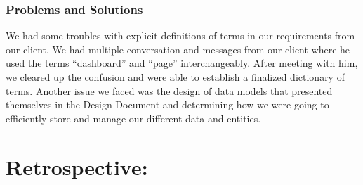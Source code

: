 \documentclass[journal,10pt,onecolumn,compsoc]{IEEEtran} \usepackage[margin=1.0in]{geometry} \usepackage{pdfpages}
\begin{document}
    \subsubsection{Problems and Solutions} 
    We had some troubles with explicit definitions of terms in our requirements from our client. We had multiple conversation and messages from our client where he used the terms ``dashboard'' and ``page'' interchangeably. After meeting with him, we cleared up the confusion and were able to establish a finalized dictionary of terms. Another issue we faced was the design of data models that presented themselves in the Design Document and determining how we were going to efficiently store and manage our different data and entities. 
    \section{Retrospective:}
    
\end{document}

